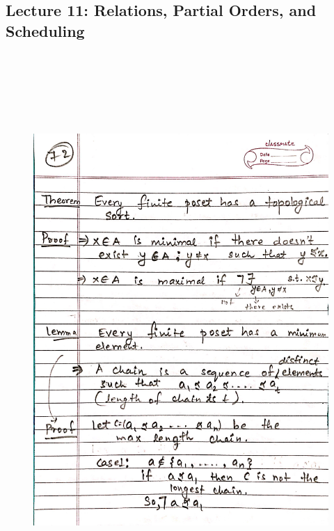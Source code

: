 \newpage
{\color{black} \subsection*{Lecture 11: Relations, Partial Orders, and Scheduling}}
\begin{figure}[H]
    \centering
    \includegraphics[width=16cm, height=21cm]{"./MIT-6.042J/MIT-6042J-072"}
\end{figure}

